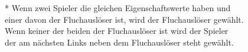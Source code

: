 \begin{tabular}{cl}
\end{tabular}

\vspace{0.5cm}
* Wenn zwei Spieler die gleichen Eigenschaftswerte haben und \\ einer davon der Fluchauslöser ist, wird der Fluchauslöser gewählt. \\
Wenn keiner der beiden der Fluchauslöser ist wird der Spieler \\ der am nächsten Links neben dem Fluchauslöser steht gewählt.

